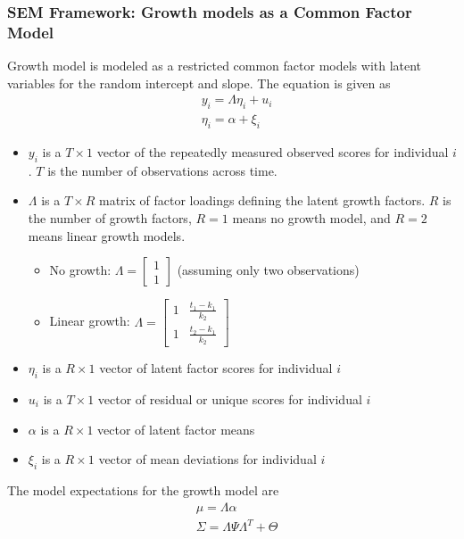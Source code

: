 \subsubsection{SEM Framework: Growth models as a Common Factor Model} 
Growth model is modeled as a restricted common factor models with latent variables for the random intercept and slope. The equation is given as 
    \begin{align*}
        & y_i = \Lambda \eta_{i} + u_i\\
        & \eta_{i} = \alpha + \xi_i
    \end{align*}
    \begin{itemize}
        \item $y_i$ is a $T \times 1$ vector of the repeatedly measured observed scores for individual $i$. $T$ is the number of observations across time. 
        \item $\Lambda$ is a $T \times R$ matrix of factor loadings defining the latent growth factors. $R$ is the number of growth factors, $R=1$ means no growth model, and $R=2$ means linear growth models. 
            \begin{itemize}
                \item No growth: $\Lambda = \begin{bmatrix} 1 \\ 1 \end{bmatrix}$ (assuming only two observations) 
                \item Linear growth: $\Lambda = \begin{bmatrix} 1 & \frac{t_1-k_1}{k_2} \\ 1 & \frac{t_2 - k_1}{k_2} \end{bmatrix}$
            \end{itemize}
        \item $\eta_i$ is a $R \times 1$ vector of latent factor scores for individual $i$ 
        \item $u_i$ is a $T \times 1$ vector of residual or unique scores for individual $i$
        \item $\alpha$ is a $R \times 1$ vector of latent factor means 
        \item $\xi_i$ is a $R \times 1$ vector of mean deviations for individual $i$ 
    \end{itemize}
The model expectations for the growth model are 
    \begin{align*}
        & \mu = \Lambda \alpha \\
        & \Sigma = \Lambda \Psi \Lambda^T + \Theta
    \end{align*}
